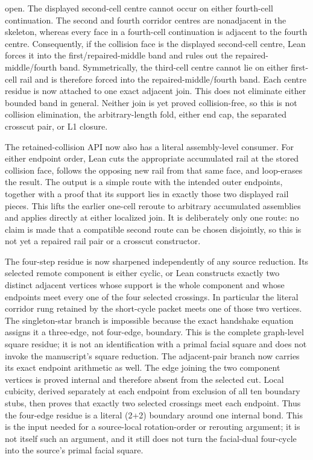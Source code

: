 \documentclass[11pt]{article}
\theoremstyle{definition}
\begin{document}
  open.  The displayed
  second-cell centre cannot occur on either fourth-cell continuation.  The
  second and fourth corridor centres are nonadjacent in the skeleton, whereas
  every face in a fourth-cell continuation is adjacent to the fourth centre.
  Consequently, if the collision face is the displayed second-cell centre, Lean
  forces it into the first/repaired-middle band and rules out the
  repaired-middle/fourth band.  Symmetrically, the third-cell centre cannot
  lie on either first-cell rail and is therefore forced into the
  repaired-middle/fourth band.  Each centre residue is now attached to one
  exact adjacent join.  This does not eliminate either bounded band in
general.  Neither join is yet proved collision-free, so this is not collision elimination, the
arbitrary-length fold, either end cap, the separated crosscut pair, or L1
closure.

The retained-collision API now also has a literal assembly-level consumer.
For either endpoint order, Lean cuts the appropriate accumulated rail at the
stored collision face, follows the opposing new rail from that same face, and
loop-erases the result.  The output is a simple route with the intended outer
endpoints, together with a proof that its support lies in exactly those two
displayed rail pieces.  This lifts the earlier one-cell reroute to arbitrary
accumulated assemblies and applies directly at either localized join.  It is
deliberately only one route: no claim is made that a compatible second route
can be chosen disjointly, so this is not yet a repaired rail pair or a crosscut
constructor.

The four-step residue is now sharpened independently of any source reduction.
Its selected remote component is either cyclic, or Lean constructs exactly two
distinct adjacent vertices whose support is the whole component and whose
endpoints meet every one of the four selected crossings.  In particular the
literal corridor rung retained by the short-cycle packet meets one of those
two vertices.  The singleton-star branch is impossible because the exact
handshake equation assigns it a three-edge, not four-edge, boundary.  This is
the complete graph-level square residue; it is not an identification with a
primal facial square and does not invoke the manuscript's square reduction.
The adjacent-pair branch now carries its exact endpoint arithmetic as well.
The edge joining the two component vertices is proved internal and therefore
absent from the selected cut.  Local cubicity, derived separately at each
endpoint from exclusion of all ten boundary stubs, then proves that exactly
two selected crossings meet each endpoint.  Thus the four-edge residue is a
literal (2+2) boundary around one internal bond.  This is the input needed
for a source-local rotation-order or rerouting argument; it is not itself
such an argument, and it still does not turn the facial-dual four-cycle into
the source's primal facial square.
\end{document}
